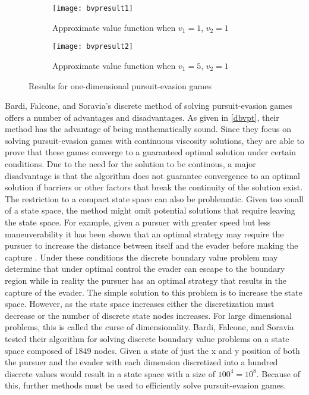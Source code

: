 \begin{figure}
\centering
\begin{subfigure}[b]{0.475\textwidth}
	\centering
	\texttt{[image: bvpresult1]}
	\caption{Approximate value function when $v_1 = 1$, $v_2 = 1$}
	\label{bvpresult1}
\end{subfigure}
\hfill
\begin{subfigure}[b]{0.475\textwidth}
	\centering
	\texttt{[image: bvpresult2]}
	\caption{Approximate value function when $v_1 = 5$, $v_2 = 1$}
	\label{bvpresult2}
\end{subfigure}
\caption{Results for one-dimensional pursuit-evasion games \cite{bardi2}}
\label{bvpresults}
\end{figure}
   
Bardi, Falcone, and Soravia's discrete method of solving pursuit-evasion games offers a number of advantages and disadvantages. As given in \ref{dbvpt}, their method has the advantage of being mathematically sound. Since they focus on solving pursuit-evasion games with continuous viscosity solutions, they are able to prove that these games converge to a guaranteed optimal solution under certain conditions. Due to the need for the solution to be continous, a major disadvantage is that the algorithm does not guarantee convergence to an optimal solution if barriers or other factors that break the continuity of the solution exist. The restriction to a compact state space can also be problematic. Given too small of a state space, the method might omit potential solutions that require leaving the state space. For example, given a pursuer with greater speed but less maneuverability it has been shown that an optimal strategy may require the pursuer to increase the distance between itself and the evader before making the capture \cite{isaacs}. Under these conditions the discrete boundary value problem may determine that under optimal control the evader can escape to the boundary region while in reality the pursuer has an optimal strategy that results in the capture of the evader. The simple solution to this problem is to increase the state space. However, as the state space increases either the discretization must decrease or the number of discrete state nodes increases. For large dimensional problems, this is called the curse of dimensionality. Bardi, Falcone, and Soravia tested their algorithm for solving discrete boundary value problems on a state space composed of 1849 nodes. Given a state of just the x and y position of both the pursuer and the evader with each dimension discretized into a hundred discrete values would result in a state space with a size of $100^4 = 10^8$. Because of this, further methods must be used to efficiently solve pursuit-evasion games. 

